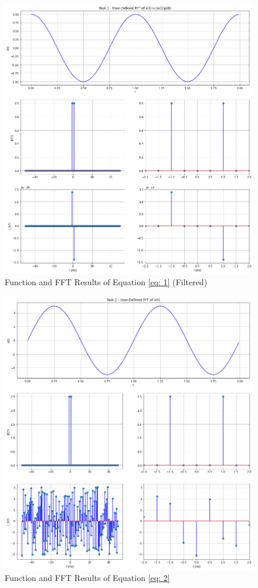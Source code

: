 \documentclass[12pt]{report}
\begin{document}
\begin{figure}[h!]
  \centering
  \includegraphics[width=\linewidth]{p1t1f.png}
  \caption{Function and FFT Results of Equation \eqref{eq: 1} (Filtered)}
  \label{fig: p1t1f}
\end{figure}
\begin{figure}[h!]
  \centering
  \includegraphics[width=\linewidth]{p1t2.png}
  \caption{Function and FFT Results of Equation \eqref{eq: 2}}
  \label{fig: p1t2}
\end{figure}
\end{document}

